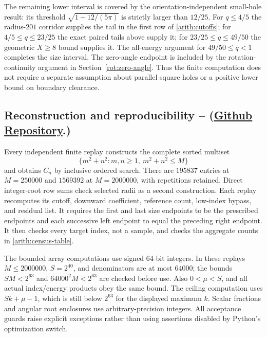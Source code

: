 \documentclass[11pt,reqno]{amsart}
\numberwithin{equation}{section}
\begin{document}
The remaining lower interval is covered by the orientation-independent
small-hole result: its threshold
$\sqrt{1-12/(5\pi)}$ is strictly larger than $12/25$.
For $q\le4/5$ the radius-$201$ corridor supplies the tail in the first
row of \eqref{arith:cutoffs}; for $4/5\le q\le23/25$ the exact
paired tails above supply it; for $23/25\le q\le49/50$ the geometric
$X\ge8$ bound supplies it.  The all-energy argument for
$49/50\le q<1$ completes the size interval.  The zero-angle endpoint
is included by the rotation-continuity argument in
Section~\ref{rot:zero-angle}.
Thus the finite computation does not require a separate assumption
about parallel square holes or a positive lower bound on boundary clearance.

\subsection{Reconstruction and reproducibility -- (\href{https://github.com/arun-chandru/arbitrary_square}{Github Repository}.)}

Every independent finite replay constructs the complete sorted multiset
\[
 \{m^2+n^2:m,n\ge1,\ m^2+n^2\le M\}
\]
and obtains $C_n$ by inclusive ordered search.  There are $195837$
entries at $M=250000$ and $1569392$ at $M=2000000$, with repetitions
retained.  Direct integer-root row sums check selected radii as a second
construction.  Each replay recomputes its cutoff, downward coefficient,
reference count, low-index bypass, and residual list.  It requires the
first and last size endpoints to be the prescribed endpoints and each
successive left endpoint to equal the preceding right endpoint.  It
then checks every target index, not a sample, and checks the aggregate
counts in \eqref{arith:census-table}.

The bounded array computations use signed 64-bit integers.  In these
replays $M\le2000000$, $S=2^{40}$, and denominators are at most $64000$;
the bounds $SM<2^{63}$ and $64000^2M<2^{63}$ are checked before use.
Also $0<\mu<S$, and all actual index/energy products obey the same
bound.  The ceiling computation uses $Sk+\mu-1$, which is still below
$2^{63}$ for the displayed maximum $k$.  Scalar fractions and angular
root enclosures use arbitrary-precision integers.  All acceptance
guards raise explicit exceptions rather than using assertions disabled
by Python's optimization switch.
\end{document}
